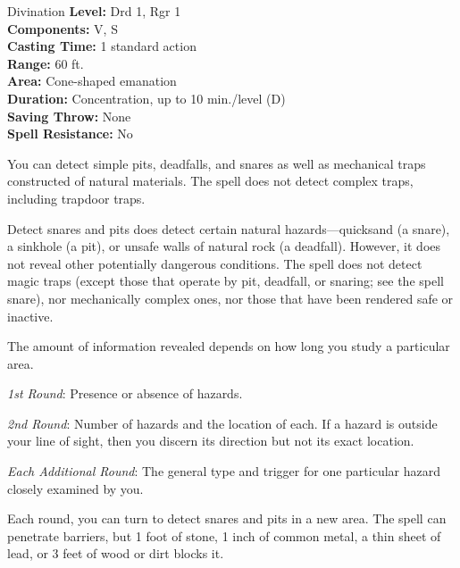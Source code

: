 {Divination}
{
	\textbf{Level:}
	Drd 1, Rgr 1\\
	\textbf{Components:}
	V, S\\
	\textbf{Casting Time:}
	1 standard action\\
	\textbf{Range:}
	60 ft.\\
	\textbf{Area:}
	Cone-shaped emanation\\
	\textbf{Duration:}
	Concentration, up to 10 min./level (D)\\
	\textbf{Saving Throw:}
	None\\
	\textbf{Spell Resistance:}
	No\\
}
{
	You can detect simple pits, deadfalls, and snares as well as mechanical traps constructed of natural materials. The spell does not detect complex traps, including trapdoor traps.

	Detect snares and pits does detect certain natural hazards---quicksand (a snare), a sinkhole (a pit), or unsafe walls of natural rock (a deadfall). However, it does not reveal other potentially dangerous conditions. The spell does not detect magic traps (except those that operate by pit, deadfall, or snaring; see the spell snare), nor mechanically complex ones, nor those that have been rendered safe or inactive.

	The amount of information revealed depends on how long you study a particular area.

	\textit{1st Round}:
	Presence or absence of hazards.

	\textit{2nd Round}:
	Number of hazards and the location of each. If a hazard is outside your line of sight, then you discern its direction but not its exact location.

	\textit{Each Additional Round}:
	The general type and trigger for one particular hazard closely examined by you.

	Each round, you can turn to detect snares and pits in a new area. The spell can penetrate barriers, but 1 foot of stone, 1 inch of common metal, a thin sheet of lead, or 3 feet of wood or dirt blocks it.

}
